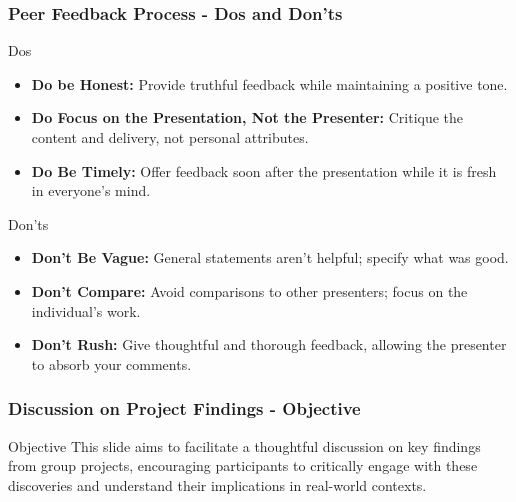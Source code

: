 \documentclass[aspectratio=169]{beamer}
\begin{document}
\begin{frame}[fragile]
    \frametitle{Peer Feedback Process - Dos and Don'ts}
    \begin{block}{Dos}
        \begin{itemize}
            \item \textbf{Do be Honest:} Provide truthful feedback while maintaining a positive tone.
            \item \textbf{Do Focus on the Presentation, Not the Presenter:} Critique the content and delivery, not personal attributes.
            \item \textbf{Do Be Timely:} Offer feedback soon after the presentation while it is fresh in everyone’s mind.
        \end{itemize}
    \end{block}

    \begin{block}{Don'ts}
        \begin{itemize}
            \item \textbf{Don't Be Vague:} General statements aren't helpful; specify what was good.
            \item \textbf{Don't Compare:} Avoid comparisons to other presenters; focus on the individual’s work.
            \item \textbf{Don't Rush:} Give thoughtful and thorough feedback, allowing the presenter to absorb your comments.
        \end{itemize}
    \end{block}
\end{frame}

\begin{frame}[fragile]
    \frametitle{Discussion on Project Findings - Objective}
    \begin{block}{Objective}
        This slide aims to facilitate a thoughtful discussion on key findings from group projects, encouraging participants to critically engage with these discoveries and understand their implications in real-world contexts.
    \end{block}
\end{frame}
\end{document}
